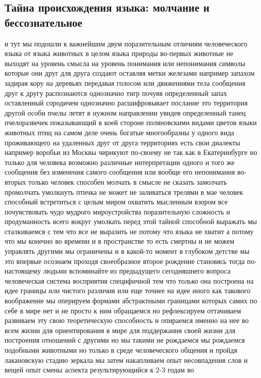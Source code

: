 \subsection{Тайна происхождения языка: молчание и бессознательное}
и тут мы подошли к важнейшим
двум поразительным отличиям человеческого языка от языка животных в целом языка
природы во-первых животные не выходят на уровень смысла на уровень понимания или
непонимания символы которые они друг для друга создают оставляя метки железами
например запахом задирая кору на деревьях передавая голосом или движениями тела
сообщения друг к другу распознаются однозначно тигр почуяв определенный запах
оставленный сородичем однозначно расшифровывает послание это территория другой
особи пчелы летят в нужном направлении увидев определенный танец пчелоразвечек
показывающий в коей стороне поляновскими видами цветов языки животных птиц на
самом деле очень богатые многообразны у одного вида проживающего на удаленных
друг от друга территориях есть свои диалекты например воробьи из Москвы чирикуют
по-своему не так как в Екатеринбурге но только для человека возможно различные
интерпретации одного и того же сообщения без изменения самого сообщения или
вообще его непонимания во-вторых только человек способен молчать в смысле не
сказать замолчать промолчать умолкнуть птичка не может не заливаться трелями в
мае человек способный встретиться с целым миром охватить мысленным взором все
почувствовать чудо мудрого мироустройства поразительную сложность и
продуманность всего вокруг умолкать перед этой тайной способной выражать мы
сталкиваемся с тем что все не выразить не потому что языка не хватит а потому
что мы конечно во времени и в пространстве то есть смертны и не можем управлять
другими мы ограничены и в какой-то момент в глубоком детстве мы это впервые
осознаем проходя своеобразное второе рождение становясь тогда по-настоящему
людьми вспоминайте из предыдущего сегодняшнего вопроса человеческая система
восприятия специфичной тем что только она построена на идее границы или чистого
различия или еще точнее на идее иного как такового воображение мы оперируем
формами абстрактными границами которых самих по себе в мире нет и не просто к
ним обращаемся но рефлексируем оттачиваем развиваем эту свою теоретическую
способность и опираемся именно на нее во всем жизни для ориентирования в мире
для поддержания своей жизни для построения отношений с другими но мы такими не
рождаемся мы рождаемся подобными животными но только в среде человеческого
общения и пройдя лакановскую стадию зеркала мы затем накапливаем опыт
несовпадения слов и вещей опыт смены аспекта результирующийся к 2-3 годам во
